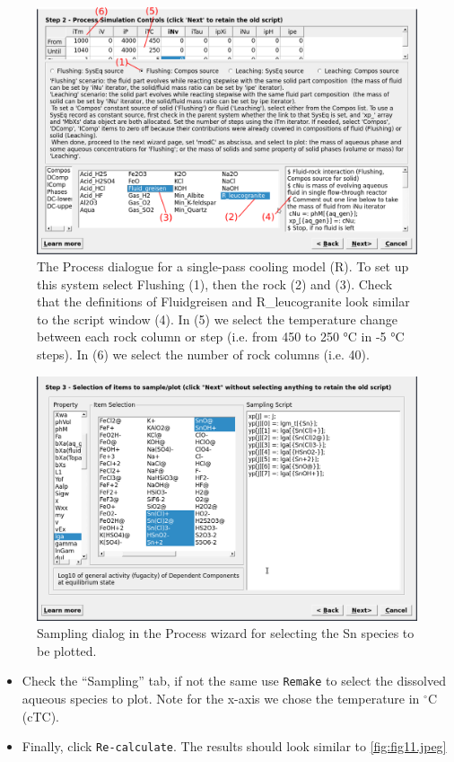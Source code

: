 \documentclass[
]{book}
\begin{document}
\begin{figure}
\includegraphics[width=1\linewidth]{figures/module4/fig-17} \caption{The Process dialogue for a single-pass cooling model (R). To set up this system select Flushing (1), then the rock (2) and (3). Check that the definitions of Fluidgreisen and R\_leucogranite look similar to the script window (4). In (5) we select the temperature change between each rock column or step (i.e. from 450 to 250 °C  in -5 °C  steps). In (6) we select the number of rock columns (i.e. 40).}\label{fig:fig-17d}
\end{figure}

\begin{figure}
\includegraphics[width=1\linewidth]{figures/module4/fig-18} \caption{Sampling dialog in the Process wizard for selecting the Sn species to be plotted.}\label{fig:fig-18d}
\end{figure}

\begin{itemize}
\item
  Check the ``Sampling'' tab, if not the same use \texttt{Remake} to select the dissolved aqueous species to plot. Note for the x-axis we chose the temperature in \(^\circ\)C (cTC).
\item
  Finally, click \texttt{Re-calculate}. The results should look similar to \autoref{fig:fig11.jpeg}
\end{itemize}
\end{document}
